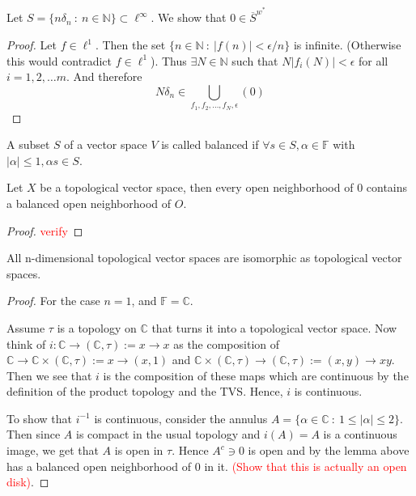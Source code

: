 
\chapter{}

\begin{example}
  Let $S = \{ n \delta_n  \ : \  n \in \mathbb{N} \} \subset
  \ell^\infty$. We show that $0 \in \overline{S}^{w^*}$
\end{example}
\begin{proof}
  Let $f \in \ell^1$. Then the set $\{ n \in \mathbb{N}  \ : \
  |f(n)| < \epsilon/n \}$ is infinite. (Otherwise this would
  contradict $f \in \ell^1$). Thus $\exists N \in \mathbb{N}$ such
  that $N|f_i(N)| < \epsilon$  for all $i = 1, 2, \ldots m$. And
  therefore $$N \delta_n \in \bigcup_{f_1 , f_2 , \ldots , f_N, \epsilon} (0)$$
\end{proof}

\begin{definition}
  A subset $S$ of a vector space $V$ is called  balanced if $\forall
  s \in S, \alpha \in \mathbb{F}$ with $|\alpha| \le 1, \alpha s \in S$.
\end{definition}

\begin{lemma}
  Let $X$ be a topological vector space, then every open neighborhood
  of ${0}$ contains a balanced open neighborhood of $O$.
\end{lemma}
\begin{proof}
  \textcolor{red}{verify}
\end{proof}

\begin{lemma}
  All n-dimensional topological vector spaces are isomorphic as
  topological vector spaces.
\end{lemma}
\begin{proof}
  For the case $n = 1$, and $\mathbb{F} = \mathbb{C}$.

  Assume $\tau$ is a topology on $\mathbb{C}$ that turns it into a
  topological vector space. Now think of $i : \mathbb{C} \to
  (\mathbb{C}, \tau) := x \to x$  as the composition of $\mathbb{C}
  \to \mathbb{C} \times (\mathbb{C} , \tau):= x \to (x, 1)$ and
  $\mathbb{C} \times (\mathbb{C} , \tau) \to (\mathbb{C} , \tau):=
  (x, y) \to xy$. Then we see  that $i$ is the composition of these
  maps which are continuous by the definition of the product topology
  and the TVS. Hence, $i$ is continuous.

  To show that $i^{-1}$ is continuous, consider the annulus $A = \{
  \alpha \in \mathbb{C}  \ : \  1 \le |\alpha| \le 2 \}$. Then since
  $A$ is compact in the usual topology and $i(A) = A$ is a continuous
  image, we get that $A$ is open in $\tau$. Hence $A^c \ni 0$ is open
  and by the lemma above has a balanced open neighborhood of $0$ in
  it. \textcolor{red}{(Show that this is actually an open disk)}.
\end{proof}

